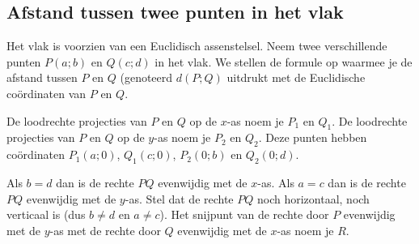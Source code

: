 \subsection{Afstand tussen twee punten in het vlak}
\noindent

Het vlak is voorzien van een Euclidisch assenstelsel.
Neem twee verschillende punten $P(a;b)$ en $Q(c;d)$ in het vlak.
We stellen de formule op waarmee je de afstand tussen $P$ en $Q$ (genoteerd $d(P;Q)$ uitdrukt met de Euclidische co\"ordinaten van $P$ en $Q$.

De loodrechte projecties van $P$ en $Q$ op de $x$-as noem je $P_1$ en $Q_1$.
De loodrechte projecties van $P$ en $Q$ op de $y$-as noem je $P_2$ en $Q_2$.
Deze punten hebben co\"ordinaten $P_1(a;0)$, $Q_1(c;0)$, $P_2(0;b)$ en $Q_2(0;d)$.

Als $b=d$ dan is de rechte $PQ$ evenwijdig met de $x$-as.
Als $a=c$ dan is de rechte $PQ$ evenwijdig met de $y$-as.
Stel dat de rechte $PQ$ noch horizontaal, noch verticaal is (dus $b\neq d$ en $a \neq c$).
Het snijpunt van de rechte door $P$ evenwijdig met de $y$-as met de rechte door $Q$ evenwijdig met de $x$-as noem je $R$.

\begin{center}
\end{center}

